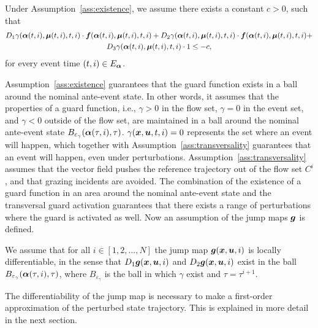 \documentclass[../DC2017114Bouma.tex]{subfiles}
\begin{document}
\begin{myass}\label{ass:transversality}
Under Assumption~\ref{ass:existence}, we assume there exists a constant $c>0$, such that
\begin{multline}
D_1\gamma(\boldsymbol{\alpha}(t,i),\boldsymbol{\mu}(t,i),t,i)\cdot{\boldsymbol{f}}(\boldsymbol{\alpha}(t,i),\boldsymbol{\mu}(t,i),t,i) + D_2\gamma(\boldsymbol{\alpha}(t,i),\boldsymbol{\mu}(t,i),t,i)\cdot{\boldsymbol{f}}(\boldsymbol{\alpha}(t,i),\boldsymbol{\mu}(t,i),t,i) +\\ D_3\gamma(\boldsymbol{\alpha}(t,i),\boldsymbol{\mu}(t,i),t,i)\cdot 1 \leq -c,
\end{multline}
for every event time $(t,i) \in E_{\boldsymbol{\alpha}}$.
\end{myass}

Assumption~\ref{ass:existence} guarantees that the guard function exists in a ball around the nominal ante-event state. In other words, it assumes that the properties of a guard function, i.e., $\gamma>0$ in the flow set, $\gamma=0$ in the event set, and $\gamma<0$ outside of the flow set, are maintained in a ball around the nominal ante-event state $B_{\varepsilon_\gamma}(\boldsymbol{\alpha}(\tau,i),\tau)$.  $\gamma({\boldsymbol{x}},{\boldsymbol{u}},t,i) = 0$ represents the set where an event will happen, which together with Assumption~\ref{ass:transversality} guarantees that an event will happen, even under perturbations. Assumption~\ref{ass:transversality} assumes that the vector field pushes the reference trajectory out of the flow set $C^i$, and that grazing incidents are avoided. The combination of the existence of a guard function in an area around the nominal ante-event state and the transversal guard activation guarantees that there exists a range of perturbations where the guard is activated as well. Now an assumption of the jump maps ${\boldsymbol{g}}$ is defined.

\begin{myass}\label{ass:jump}
We assume that for all $i \in [1,2,...,N]$ the jump map ${\boldsymbol{g}}({\boldsymbol{x}},{\boldsymbol{u}},i)$ is locally differentiable, in the sense that $D_1{\boldsymbol{g}}({\boldsymbol{x}},{\boldsymbol{u}},i)$ and $D_2{\boldsymbol{g}}({\boldsymbol{x}},{\boldsymbol{u}},i)$ exist in the ball $B_{\varepsilon_{\gamma}}(\boldsymbol{\alpha}(\tau,i),\tau)$, where $B_{\varepsilon_{\gamma}}$ is the ball in which $\gamma$ exist and $\tau = \tau^{i+1}$.
\end{myass}

The differentiability of the jump map is necessary to make a first-order approximation of the perturbed state trajectory. This is explained in more detail in the next section.
\end{document}
